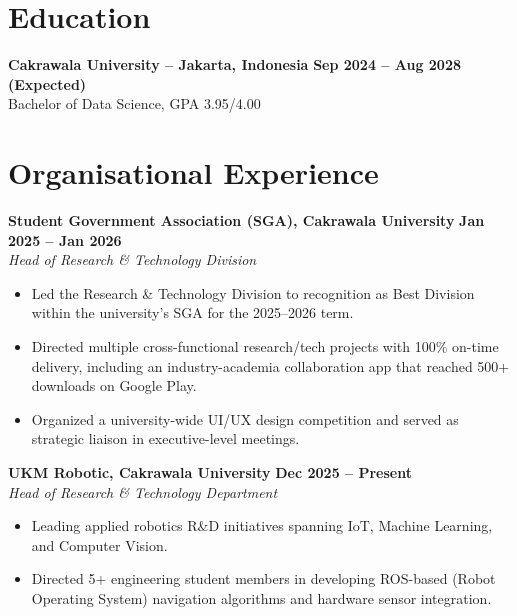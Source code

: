 \documentclass[10pt, letterpaper]{article}
\newcommand{\plainheader}[2]{%
  \noindent\textbf{#1} \hfill \textbf{#2}\\[1.5pt]
}
\begin{document}
\section{Education}
\plainheader{Cakrawala University -- Jakarta, Indonesia}{Sep 2024 -- Aug 2028 (Expected)}
Bachelor of Data Science, GPA 3.95/4.00

\section{Organisational Experience}

\plainheader{Student Government Association (SGA), Cakrawala University}{Jan 2025 -- Jan 2026}
\textit{Head of Research \& Technology Division}
\begin{itemize}
  \item Led the Research \& Technology Division to recognition as Best Division within the university's SGA for the 2025--2026 term.
  \item Directed multiple cross-functional research/tech projects with 100\% on-time delivery, including an industry-academia collaboration app that reached 500+ downloads on Google Play.
  \item Organized a university-wide UI/UX design competition and served as strategic liaison in executive-level meetings.
\end{itemize}
\vspace{2pt}

\plainheader{UKM Robotic, Cakrawala University}{Dec 2025 -- Present}
\textit{Head of Research \& Technology Department}
\begin{itemize}
  \item Leading applied robotics R\&D initiatives spanning IoT, Machine Learning, and Computer Vision.
  \item Directed 5+ engineering student members in developing ROS-based (Robot Operating System) navigation algorithms and hardware sensor integration.
\end{itemize}

\end{document}
